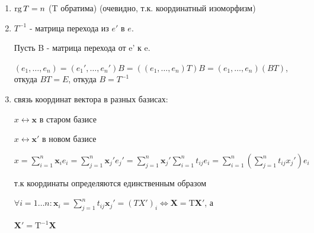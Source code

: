 \begin{enumerate}
    \item \(\operatorname{rg} T = n\) (T обратима) (очевидно, т.к. координатный изоморфизм)


    \item \(T^{-1}\) - матрица перехода из \(e'\) в \(e\).

          Пусть B - матрица перехода от e' к e.

          \((e_1,\ldots,e_n) = (e_1',\ldots,e_n')B = ((e_1,\ldots,e_n)T)B = (e_1,\ldots,e_n) (BT)\), откуда \(BT = E\),  откуда  \(B = T^{-1}\)


    \item связь координат вектора в разных базисах:

          \(x \leftrightarrow \mathbf{x}\) в старом базисе

          \(x \leftrightarrow \mathbf{x}'\) в новом базисе

          \(x = \sum\limits_{i=1}^n \mathbf{x}_i e_i  = \sum \limits_{j=1}^n \mathbf{x}_j'e_j' = \sum\limits_{j=1}^n \mathbf{x}_j' \sum\limits_{i=1}^n t_{ij} e_i = \sum\limits_{i=1}^n (\sum\limits_{j=1}^n t_{ij}x_j')e_i\)

          т.к координаты определяются единственным образом

          \(\forall i = 1\ldots n: \mathbf{x}_i =\sum\limits_{j=1}^n t_{ij} \mathbf{x}_j' = (TX')_i \Leftrightarrow \mathbf{X}=\text{T}\mathbf{X}'\), а

          \(\mathbf{X}'=\text{T}^{-1}\mathbf{X}\)
\end{enumerate}


